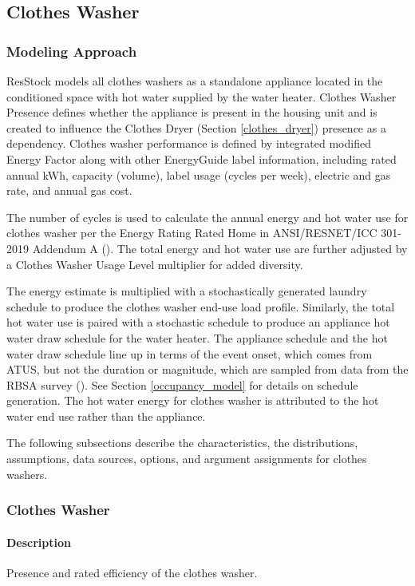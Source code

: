 \subsection{Clothes Washer}
\subsubsection{Modeling Approach}
ResStock models all clothes washers as a standalone appliance located in the conditioned space with hot water supplied by the water heater. Clothes Washer Presence defines whether the appliance is present in the housing unit and is created to influence the Clothes Dryer (Section \ref{clothes_dryer}) presence as a dependency. Clothes washer performance is defined by integrated modified Energy Factor along with other EnergyGuide label information, including rated annual kWh, capacity (volume), label usage (cycles per week), electric and gas rate, and annual gas cost. 

The number of cycles is used to calculate the annual energy and hot water use for clothes washer per the Energy Rating Rated Home in ANSI/RESNET/ICC 301-2019 Addendum A (\cite{ansi_resnet_301_2019}). The total energy and hot water use are further adjusted by a Clothes Washer Usage Level multiplier for added diversity. 

The energy estimate is multiplied with a stochastically generated laundry schedule to produce the clothes washer end-use load profile. Similarly, the total hot water use is paired with a stochastic schedule to produce an appliance hot water draw schedule for the water heater. The appliance schedule and the hot water draw schedule line up in terms of the event onset, which comes from ATUS, but not the duration or magnitude, which are sampled from data from the RBSA survey (\cite{RBSA}). See Section \ref{occupancy_model} for details on schedule generation. The hot water energy for clothes washer is attributed to the hot water end use rather than the appliance.

The following subsections describe the characteristics, the distributions, assumptions, data sources, options, and argument assignments for clothes washers.

\subsubsection{Clothes Washer}
\paragraph{Description}
Presence and rated efficiency of the clothes washer.

